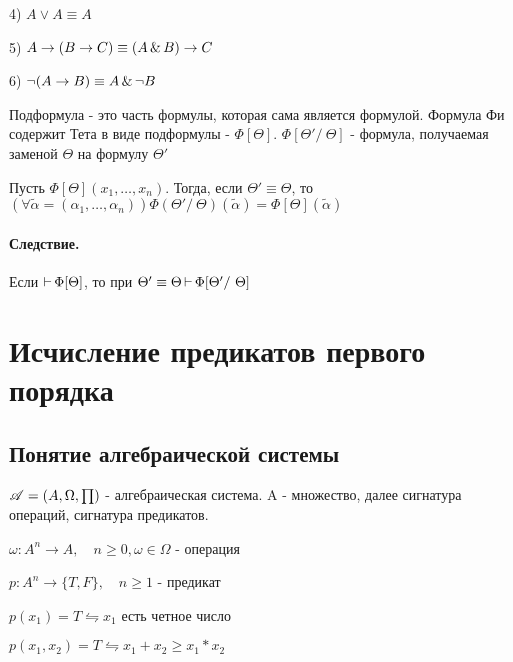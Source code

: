 

\title{}
\author{Козырнов Александр Дмитриевич, ИУ7-32Б}
\date{\today}



4) $A \lor A \equiv A$

5)  $A \to (B \to C) \equiv (A\operatorname{\&} B) \to C$

6) $\lnot(A \to B) \equiv A\operatorname{\&} \lnot B$

\begin{definition}
Подформула - это часть формулы, которая сама является формулой. Формула Фи содержит
Тета в виде подформулы - $\Phi[\Theta]$.  $\Phi[\Theta' /\ \Theta]$ - формула, получаемая заменой
$\Theta$ на формулу  $\Theta'$
\end{definition}

\begin{theorem}
    Пусть $\Phi[\Theta](x_1,\ldots,x_n)$. Тогда, если $\Theta' \equiv \Theta$,  то
    $(\forall \widetilde{\alpha} = (\alpha_1,\ldots,\alpha_n))
    \Phi(\Theta' /\ \Theta)(\widetilde{\alpha}) = \Phi[\Theta](\widetilde{\alpha})$
\end{theorem}

\paragraph*{Следствие.}
Если $\operatorname{\vdash} \Phi[\Theta]$, то при  $\Theta' \equiv \Theta \step \Phi[\Theta' /\ \Theta]$

\section{Исчисление предикатов первого порядка}

\subsection{Понятие алгебраической системы}

 \begin{definition}
 $\mathscr{A} = (A, \Omega, \prod)$ - алгебраическая система. A - множество, далее сигнатура
 операций, сигнатура предикатов.

 $\omega: A^{n} \to A, \quad n\ge 0, \omega \in \Omega$ - операция

 $p: A^{n} \to \{T,F\},\quad n \ge 1 $ - предикат
 \end{definition}

$p(x_1) = T \leftrightharpoons x_1$ есть четное число

$p(x_1,x_2) = T \leftrightharpoons x_1 + x_2 \ge x_1*x_2$

